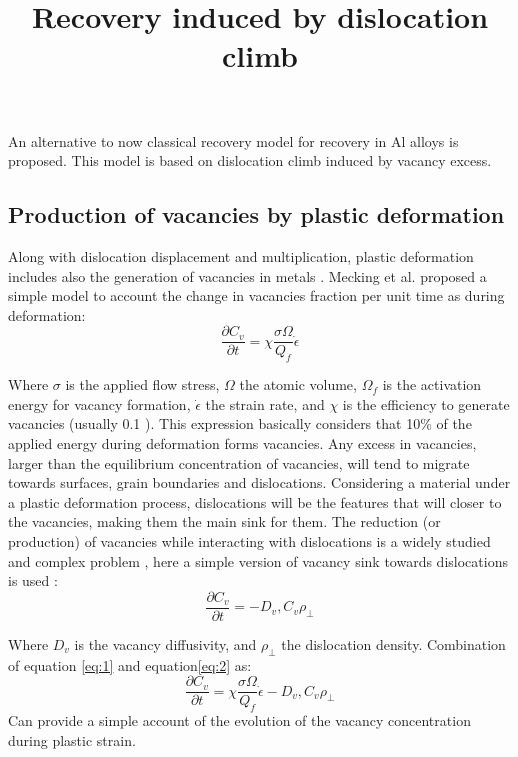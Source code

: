 \documentclass{article}
\begin{document}
\title{Recovery induced by dislocation climb}

An alternative to now classical recovery model for recovery in Al alloys is proposed. This model is based on dislocation climb induced by vacancy excess. 

\subsection{Production of vacancies by plastic deformation}
Along with dislocation displacement and multiplication, plastic deformation includes also the generation of vacancies in metals \cite{mecking_effect_1980,deschamps_situ_2012,hutchinson_quantitative_2014,militzer_modelling_1994}. Mecking et al. proposed a simple model to account the change in vacancies fraction per unit time as during deformation:
\begin{equation} \label{eq:1}
\frac{\partial C_v}{\partial t}=\chi \frac{\sigma \Omega}{Q_f}\dot{\epsilon}
\end{equation}

Where $\sigma$ is the applied flow stress, $\Omega$ the atomic volume, $\Omega_f$ is the activation energy for vacancy formation, $\dot{\epsilon}$ the strain rate, and $\chi$ is the efficiency to generate vacancies (usually 0.1 \cite{mecking_effect_1980,deschamps_situ_2012}). This expression basically considers that 10\% of the applied energy during deformation forms vacancies. Any excess in vacancies, larger than the equilibrium concentration of vacancies, will tend to migrate towards surfaces, grain boundaries and dislocations. Considering a material under a plastic deformation process, dislocations will be the features that will closer to the vacancies, making them the main sink for them. The reduction (or production) of vacancies while interacting with dislocations is a widely studied and complex problem \cite{clouet_vacancyedge_2006,bullough_kinetics_1970}, here a simple version of vacancy sink towards dislocations is used \cite{militzer_modelling_1994,deschamps_situ_2012,hutchinson_quantitative_2014}:
\begin{equation}\label{eq:2}
\frac{\partial C_v}{\partial t}=-D_v,C_v \rho_\bot
\end{equation}

Where $D_v$ is the vacancy diffusivity, and $\rho_\bot$ the dislocation density. Combination of equation \ref{eq:1} and equation\ref{eq:2} as:
\begin{equation}\label{eq:3}
\frac{\partial C_v}{\partial t}=\chi \frac{\sigma \Omega}{Q_f}\dot{\epsilon}-D_v,C_v \rho_\bot
\end{equation}
Can provide a simple account of the evolution of the vacancy concentration during plastic strain.
\end{document}
